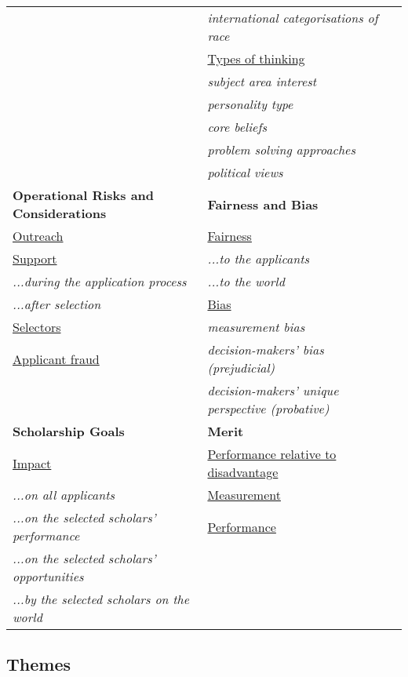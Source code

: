 \begin{table}[htbp]
\begin{tabular}{|p{}|p{}|}
         & \emph{international categorisations of race} \\
         & \underline{Types of thinking} \\
         & \emph{subject area interest} \\
         & \emph{personality type} \\
         & \emph{core beliefs} \\
         & \emph{problem solving approaches} \\
         & \emph{political views} \\
        \hline
        \textbf{Operational Risks and Considerations} & \textbf{Fairness and Bias} \\
        \underline{Outreach} & \underline{Fairness} \\
        \underline{Support} & \emph{...to the applicants} \\
        \emph{...during the application process} & \emph{...to the world} \\
        \emph{...after selection} & \underline{Bias} \\
        \underline{Selectors} & \emph{measurement bias} \\
        \underline{Applicant fraud} & \emph{decision-makers' bias (prejudicial)} \\
         & \emph{decision-makers' unique perspective (probative)} \\
        \hline
        \textbf{Scholarship Goals} & \textbf{Merit} \\
        \underline{Impact} & \underline{Performance relative to disadvantage} \\
        \emph{...on all applicants} & \underline{Measurement} \\
        \emph{...on the selected scholars' performance} & \underline{Performance} \\
        \emph{...on the selected scholars' opportunities} & \\
        \emph{...by the selected scholars on the world} & \\
        \hline
    \end{tabular}
\end{table}

\subsection{Themes}\label{ssec:themes}
